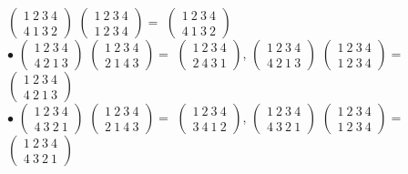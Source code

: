 \documentclass[12pt,a4paper]{scrartcl}
\begin{document}
	$\begin{pmatrix}
	1~2~3~4\\
	4~1~3~2
	\end{pmatrix}$
	$\begin{pmatrix}
	1~2~3~4\\
	1~2~3~4
	\end{pmatrix} = $
	$\begin{pmatrix}
	1~2~3~4\\
	4~1~3~2	\end{pmatrix}$\\
	$\bullet$
	$\begin{pmatrix}
	1~2~3~4\\
	4~2~1~3
	\end{pmatrix}$
	$\begin{pmatrix}
	1~2~3~4\\
	2~1~4~3
	\end{pmatrix} = $ $\begin{pmatrix}
	1~2~3~4\\
	2~4~3~1
	\end{pmatrix}$, 
	$\begin{pmatrix}
	1~2~3~4\\
	4~2~1~3
	\end{pmatrix}$
	$\begin{pmatrix}
	1~2~3~4\\
	1~2~3~4
	\end{pmatrix} = $
	$\begin{pmatrix}
	1~2~3~4\\
	4~2~1~3	\end{pmatrix}$\\
	$\bullet$
	$\begin{pmatrix}
	1~2~3~4\\
	4~3~2~1
	\end{pmatrix}$
	$\begin{pmatrix}
	1~2~3~4\\
	2~1~4~3
	\end{pmatrix} = $ $\begin{pmatrix}
	1~2~3~4\\
	3~4~1~2
	\end{pmatrix}$, 
	$\begin{pmatrix}
	1~2~3~4\\
	4~3~2~1
	\end{pmatrix}$
	$\begin{pmatrix}
	1~2~3~4\\
	1~2~3~4
	\end{pmatrix} = $
	$\begin{pmatrix}
	1~2~3~4\\
	4~3~2~1	\end{pmatrix}$\\
\end{document}
